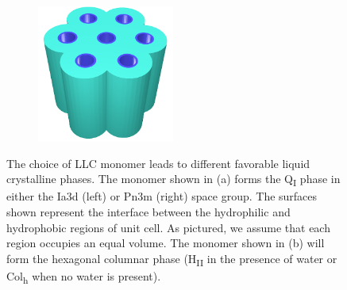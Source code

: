 \documentclass[journal=jpcbfk,manusciprt=article]{achemso}
\begin{document}
\begin{figure}
\begin{subfigure}{0.45\textwidth}
        \includegraphics[height=4.5cm]{hexagonal_packing.png}
        \caption{}\label{fig:hII_phase}
  \end{subfigure}
  \caption{The choice of LLC monomer leads to different favorable liquid
        crystalline phases. The monomer shown in (a) forms the Q\textsubscript{I} phase
        in either the Ia3d (left) or Pn3m (right) space group. The surfaces shown
        represent the interface between the hydrophilic and hydrophobic regions of unit
        cell. As pictured, we assume that each region occupies an equal volume. The
        monomer shown in (b) will form the hexagonal columnar phase
        (H\textsubscript{II} in the presence of water or Col\textsubscript{h} when no
         water is present).}\label{fig:bcc_v_hII}
  \end{figure}


 

\end{document}
